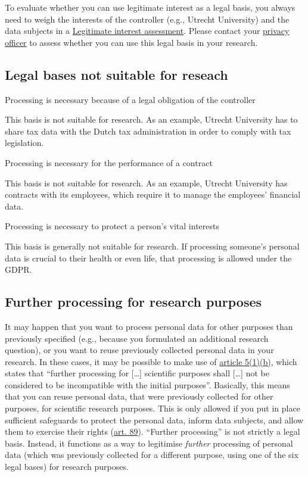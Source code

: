 \documentclass[
]{book}
\begin{document}
To evaluate whether you can use legitimate interest as a legal basis, you
always need to weigh the interests of the controller (e.g., Utrecht
University) and the data subjects in a
\protect\hyperlink{legitimate-interest-assessment}{Legitimate interest assessment}.
Please contact your \protect\hyperlink{support}{privacy officer} to assess whether you
can use this legal basis in your research.

\hypertarget{legal-bases-not-suitable-for-reseach}{%
\subsection{Legal bases not suitable for reseach}\label{legal-bases-not-suitable-for-reseach}}

Processing is necessary because of a legal obligation of the controller

This basis is not suitable for research. As an example, Utrecht
University has to share tax data with the Dutch tax administration in
order to comply with tax legislation.

Processing is necessary for the performance of a contract

This basis is not suitable for research. As an example, Utrecht
University has contracts with its employees, which require it to manage
the employees' financial data.

Processing is necessary to protect a person's vital interests

This basis is generally not suitable for research. If processing
someone's personal data is crucial to their health or even life, that
processing is allowed under the GDPR.

\hypertarget{further-processing}{%
\subsection{Further processing for research purposes}\label{further-processing}}

It may happen that you want to process personal data for other purposes than
previously specified (e.g., because you formulated an additional research
question), or you want to reuse previously collected personal data in your
research. In these cases, it may be possible to make use of
\href{https://gdpr-info.eu/art-5-gdpr/}{article 5(1)(b)},
which states that ``further processing for {[}\ldots{]} scientific purposes shall {[}\ldots{]}
not be considered to be incompatible with the initial purposes''. Basically, this
means that you can reuse personal data, that were previously collected for other
purposes, for scientific research purposes. This is only allowed if you put in
place sufficient safeguards to protect the personal data, inform data subjects,
and allow them to exercise their rights
(\href{https://gdpr-info.eu/art-89-gdpr/}{art. 89}).
``Further processing'' is not strictly a legal basis. Instead, it functions as a
way to legitimise \emph{further} processing of personal data (which was previously
collected for a different purpose, using one of the six legal bases) for research
purposes.
\end{document}

